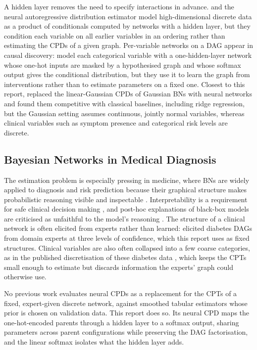 \documentclass[a4paper,fleqn]{cas-dc}
\begin{document}
A hidden layer removes the need to specify interactions in advance. \citet{bengio2000taking} and the neural autoregressive distribution estimator \citep{larochelle2011neural} model high-dimensional discrete data as a product of conditionals computed by networks with a hidden layer, but they condition each variable on all earlier variables in an ordering rather than estimating the CPDs of a given graph. Per-variable networks on a DAG appear in causal discovery: \citet{ke2019learning} model each categorical variable with a one-hidden-layer network whose one-hot inputs are masked by a hypothesised graph and whose softmax output gives the conditional distribution, but they use it to learn the graph from interventions rather than to estimate parameters on a fixed one. Closest to this report, \citet{Gaogle2026} replaced the linear-Gaussian CPDs of Gaussian BNs with neural networks and found them competitive with classical baselines, including ridge regression, but the Gaussian setting assumes continuous, jointly normal variables, whereas clinical variables such as symptom presence and categorical risk levels are discrete.

\subsection{Bayesian Networks in Medical Diagnosis}

The estimation problem is especially pressing in medicine, where BNs are widely applied to diagnosis and risk prediction because their graphical structure makes probabilistic reasoning visible and inspectable \citep{comprehensive_kyrimi_2021,zhong2024predicting}. Interpretability is a requirement for safe clinical decision making \citep{explainable_hulsen_2023}, and post-hoc explanations of black-box models are criticised as unfaithful to the model's reasoning \citep{stop_rudin_2019}. The structure of a clinical network is often elicited from experts rather than learned: \citet{zahoor2025investigatingvaliditystructurelearning} elicited diabetes DAGs from domain experts at three levels of confidence, which this report uses as fixed structures. Clinical variables are also often collapsed into a few coarse categories, as in the published discretisation of these diabetes data \citep{zahoor2025investigatingvaliditystructurelearning}, which keeps the CPTs small enough to estimate but discards information the experts' graph could otherwise use.

No previous work evaluates neural CPDs as a replacement for the CPTs of a fixed, expert-given discrete network, against smoothed tabular estimators whose prior is chosen on validation data. This report does so. Its neural CPD maps the one-hot-encoded parents through a hidden layer to a softmax output, sharing parameters across parent configurations while preserving the DAG factorisation, and the linear softmax isolates what the hidden layer adds.
\end{document}

